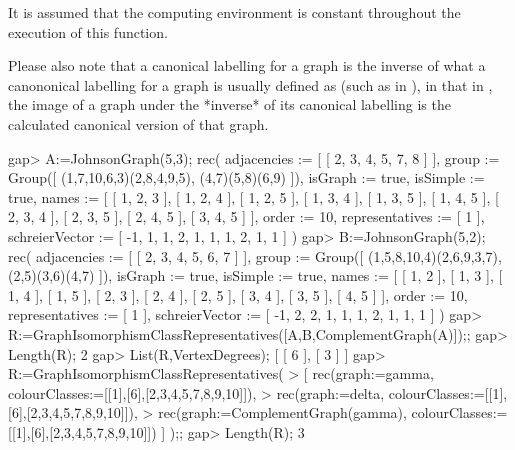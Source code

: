 It is assumed that the computing environment is constant throughout the 
execution of this function.

Please also note that a canonical labelling for a {\GRAPE} graph is the
inverse of what a canononical labelling for a graph is usually defined as
(such as in {\bliss}), in that in {\GRAPE}, the image of a graph under
the *inverse* of its canonical labelling is the calculated canonical
version of that graph.

\beginexample 
gap> A:=JohnsonGraph(5,3);
rec( adjacencies := [ [ 2, 3, 4, 5, 7, 8 ] ], 
  group := Group([ (1,7,10,6,3)(2,8,4,9,5), (4,7)(5,8)(6,9) ]), 
  isGraph := true, isSimple := true, 
  names := [ [ 1, 2, 3 ], [ 1, 2, 4 ], [ 1, 2, 5 ], [ 1, 3, 4 ], [ 1, 3, 5 ], 
      [ 1, 4, 5 ], [ 2, 3, 4 ], [ 2, 3, 5 ], [ 2, 4, 5 ], [ 3, 4, 5 ] ], 
  order := 10, representatives := [ 1 ], 
  schreierVector := [ -1, 1, 1, 2, 1, 1, 1, 2, 1, 1 ] )
gap> B:=JohnsonGraph(5,2);
rec( adjacencies := [ [ 2, 3, 4, 5, 6, 7 ] ], 
  group := Group([ (1,5,8,10,4)(2,6,9,3,7), (2,5)(3,6)(4,7) ]), 
  isGraph := true, isSimple := true, 
  names := [ [ 1, 2 ], [ 1, 3 ], [ 1, 4 ], [ 1, 5 ], [ 2, 3 ], [ 2, 4 ], 
      [ 2, 5 ], [ 3, 4 ], [ 3, 5 ], [ 4, 5 ] ], order := 10, 
  representatives := [ 1 ], schreierVector := [ -1, 2, 2, 1, 1, 1, 2, 1, 1, 1 
     ] )
gap> R:=GraphIsomorphismClassRepresentatives([A,B,ComplementGraph(A)]);;
gap> Length(R);
2
gap> List(R,VertexDegrees);
[ [ 6 ], [ 3 ] ]
gap> R:=GraphIsomorphismClassRepresentatives( 
>    [ rec(graph:=gamma, colourClasses:=[[1],[6],[2,3,4,5,7,8,9,10]]), 
>      rec(graph:=delta, colourClasses:=[[1],[6],[2,3,4,5,7,8,9,10]]), 
>      rec(graph:=ComplementGraph(gamma), colourClasses:=[[1],[6],[2,3,4,5,7,8,9,10]]) ] );; 
gap> Length(R);
3
\endexample

